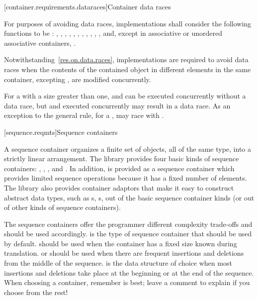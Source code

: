 [container.requirements.dataraces]{Container data races}

\pnum
For purposes of avoiding data races, implementations shall
consider the following functions to be : , ,
, , , , , ,
, , ,  and, except in
associative or unordered associative containers, .

\pnum
Notwithstanding~\ref{res.on.data.races}, implementations are required to avoid data
races when the contents of the contained object in different elements in the same
container, excepting , are modified concurrently.

\pnum
\begin{note} For a  with a size greater than one, 
and  can be executed concurrently without a data race, but
 and  executed concurrently may result in a data
race.
As an exception to the general rule, for a , 
may race with .
\end{note}

[sequence.reqmts]{Sequence containers}

\pnum
A sequence container organizes a finite set of objects, all of the same type, into a strictly
linear arrangement. The library provides four basic kinds of sequence containers:
, , , and . In addition,
 is provided as a sequence container which provides limited sequence operations
because it has a fixed number of elements. The library also provides container
adaptors that make it easy to construct abstract data types, such
as s, s, out of the basic sequence container kinds (or out
of other kinds of sequence containers).

\pnum
\begin{note}
The sequence containers
offer the programmer different complexity trade-offs and should be used
accordingly.
is the type of sequence container that should be used by default.
should be used when the container has a fixed size known during translation.
 or 
should be used when there are frequent insertions and deletions from the
middle of the sequence.
is the data structure of choice
when most insertions and deletions take place at the beginning or at the
end of the sequence.
When choosing a container, remember  is best;
leave a comment to explain if you choose from the rest!
\end{note}

